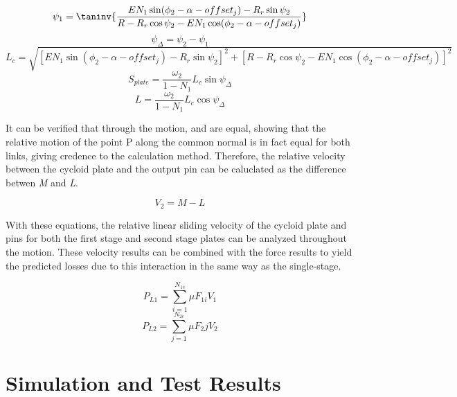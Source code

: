 \begin{equation}\label{eq:psi_1}
\psi_1 = \taninv{\frac{E N_1 \sin(\phi_2-\alpha-offset_j) - R_r\sin\psi_2}
{R-R_r\cos\psi_2 - E N_1\cos(\phi_2-\alpha-offset_j)}}
\end{equation}
\begin{equation} \label{eq:psi_delta}
\psi_{\Delta} = \psi_2 - \psi_1
\end{equation}
\begin{equation}\label{eq:L_c}
L_{c} = \sqrt{\left[E N_1 \sin(\phi_2-\alpha-offset_j) - R_r\sin\psi_2\right]^2 + 
\left[R-R_r\cos\psi_2 - E N_1 \cos(\phi_2-\alpha-offset_j)\right]^2}
\end{equation}
\begin{equation}\label{eq:s_plate}
S_{plate} = \frac{\omega_2}{1-N_1} L_c \sin\psi_{\Delta}
\end{equation}
\begin{equation}\label{eq:L}
L = \frac{\omega_2}{1-N_1} L_c \cos\psi_{\Delta}
\end{equation}

It can be verified that through the motion,  and  are equal, showing that the relative motion of the point P along the common normal is in fact equal for both links, giving credence to the calculation method. Therefore, the relative velocity between the cycloid plate and the output pin can be caluclated as the difference betwen \textit{M} and \textit{L}.

\begin{equation}
V_{2} = M - L
\end{equation}

With these equations, the relative linear sliding velocity of the cycloid plate and pins for both the first stage and second stage plates can be analyzed throughout the motion. These velocity results can be combined with the force results to yield the predicted losses due to this interaction in the same way as the single-stage.

\begin{equation} \label{eq:dual_power_loss_1}
P_{L1} = \sum_{i=1}^{N_{1c}}\mu F_{1i} V_1
\end{equation}
\begin{equation} \label{eq:dual_power_loss_2}
P_{L2} = \sum_{j=1}^{N_{2c}}\mu F_2j V_2
\end{equation}


\section{Simulation and Test Results} \label{ch:dual:test_results}

